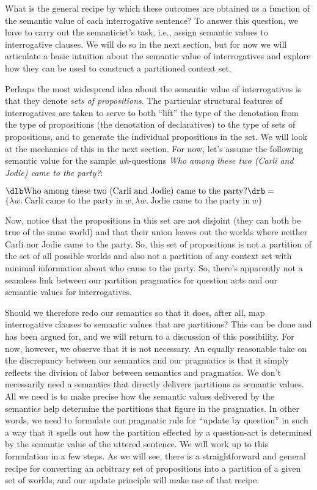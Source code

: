 What is the general recipe by which these outcomes are obtained as a function of
the semantic value of each interrogative sentence? To answer this question, we
have to carry out the semanticist's task, i.e., assign semantic values to
interrogative clauses. We will do so in the next section, but for now we will
articulate a basic intuition about the semantic value of interrogatives and
explore how they can be used to construct a partitioned context set.

Perhaps the most widespread idea about the semantic value of interrogatives is
that they denote \emph{sets of propositions}. The particular structural features
of interrogatives are taken to serve to both ``lift'' the type of the denotation
from the type of propositions (the denotation of declaratives) to the type of
sets of propositions, and to generate the individual propositions in the set. We
will look at the mechanics of this in the next section. For now, let's assume
the following semantic value for the sample \emph{wh}-questions \emph{Who among
  these two (Carli and Jodie) came to the party?}:

\ex
$\svt{Who among these two (Carli and Jodie) came to the party?} =$\\
$\{\lambda w.\ \text{Carli came to the party in}\ w, \lambda w.\ \text{Jodie
  came to the party in}\ w\}$
\xe

Now, notice that the propositions in this set are not disjoint (they can both be
true of the same world) and that their union leaves out the worlds where neither
Carli nor Jodie came to the party. So, this set of propositions is not a
partition of the set of all possible worlds and also not a partition of any
context set with minimal information about who came to the party. So, there's
apparently not a seamless link between our partition pragmatics for question
acts and our semantic values for interrogatives.

Should we therefore redo our semantics so that it does, after all, map
interrogative clauses to semantic values that are partitions? This can be done
and has been argued for, and we will return to a discussion of this possibility.
For now, however, we observe that it is not necessary. An equally reasonable
take on the discrepancy between our semantics and our pragmatics is that it
simply reflects the division of labor between semantics and pragmatics. We don't
necessarily need a semantics that directly delivers partitions as semantic
values. All we need is to make precise how the semantic values delivered by the
semantics help determine the partitions that figure in the pragmatics. In other
words, we need to formulate our pragmatic rule for ``update by question'' in
such a way that it spells out how the partition effected by a question-act is
determined by the semantic value of the uttered sentence. We will work up to
this formulation in a few steps. As we will see, there is a straightforward and
general recipe for converting an arbitrary set of propositions into a partition
of a given set of worlds, and our update principle will make use of that recipe.

